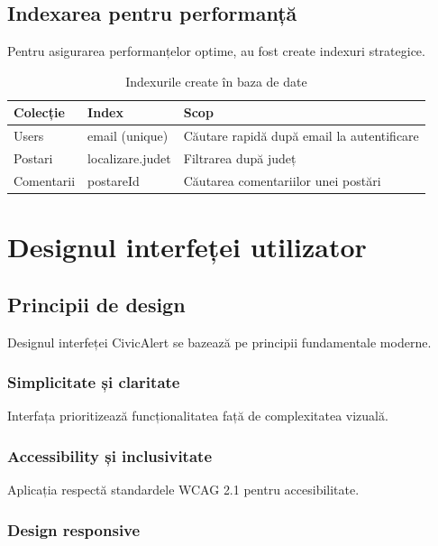 \documentclass[12pt,a4paper]{report}
\begin{document}
\subsection{Indexarea pentru performanță}

Pentru asigurarea performanțelor optime, au fost create indexuri strategice.

\begin{table}[H]
\centering
\caption{Indexurile create în baza de date}
\label{tab:indexuri_db}
\begin{tabular}{|l|l|p{6cm}|}
\hline
\textbf{Colecție} & \textbf{Index} & \textbf{Scop} \\
\hline
Users & email (unique) & Căutare rapidă după email la autentificare \\
\hline
Postari & localizare.judet & Filtrarea după județ \\
\hline
Comentarii & postareId & Căutarea comentariilor unei postări \\
\hline
\end{tabular}
\end{table}

\section{Designul interfeței utilizator}

\subsection{Principii de design}

Designul interfeței CivicAlert se bazează pe principii fundamentale moderne.

\subsubsection{Simplicitate și claritate}

Interfața prioritizează funcționalitatea față de complexitatea vizuală.

\subsubsection{Accessibility și inclusivitate}

Aplicația respectă standardele WCAG 2.1 pentru accesibilitate.

\subsubsection{Design responsive}
\end{document}
